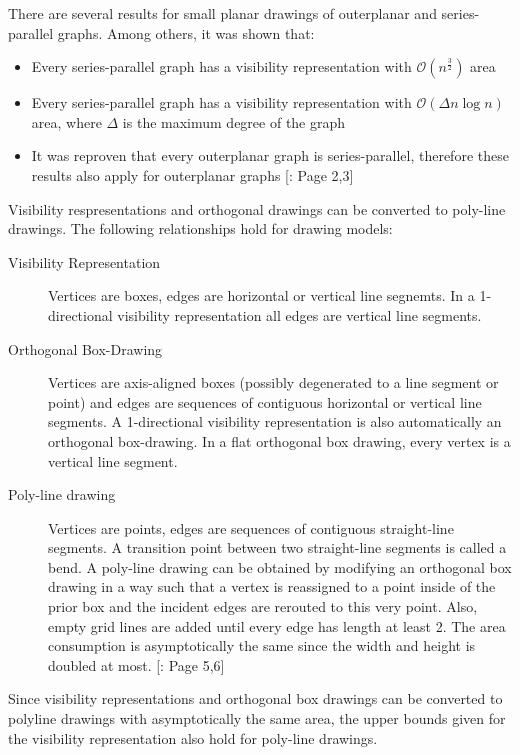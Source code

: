 There are several results for small planar drawings of outerplanar and series-parallel graphs. Among others, it was shown that:
\begin{itemize}
	\item Every series-parallel graph has a visibility representation with $\mathcal{O}(n^{\frac{3}{2}})$ area
	\item Every series-parallel graph has a visibility representation with $\mathcal{O}(\Delta n\log n)$ area, where $\Delta$ is the maximum degree of the graph
	\item It was reproven that every outerplanar graph is series-parallel, therefore these results also apply for outerplanar graphs [\cite{DBLP:journals/dcg/Biedl11}: Page 2,3]
\end{itemize}
Visibility respresentations and orthogonal drawings can be converted to poly-line drawings. The following relationships hold for drawing models:
\begin{description}
	\item[Visibility Representation] Vertices are boxes, edges are horizontal or vertical line segnemts. In a 1-directional visibility representation all edges are vertical line segments.
	\item[Orthogonal Box-Drawing] Vertices are axis-aligned boxes (possibly degenerated to a line segment or point) and edges are sequences of contiguous horizontal or vertical line segments. A 1-directional visibility representation is also automatically an orthogonal box-drawing. In a flat orthogonal box drawing, every vertex is a vertical line segment.
	\item[Poly-line drawing] Vertices are points, edges are sequences of contiguous straight-line segments. A transition point between two straight-line segments is called a bend. A poly-line drawing can be obtained by modifying an orthogonal box drawing in a way such that a vertex is reassigned to a point inside of the prior box and the incident edges are rerouted to this very point. Also, empty grid lines are added until every edge has length at least 2. The area consumption is asymptotically the same since the width and height is doubled at most.
	[\cite{DBLP:journals/dcg/Biedl11}: Page 5,6]
\end{description}
Since visibility representations and orthogonal box drawings can be converted to polyline drawings with asymptotically the same area, the upper bounds given for the visibility representation also hold for poly-line drawings.
